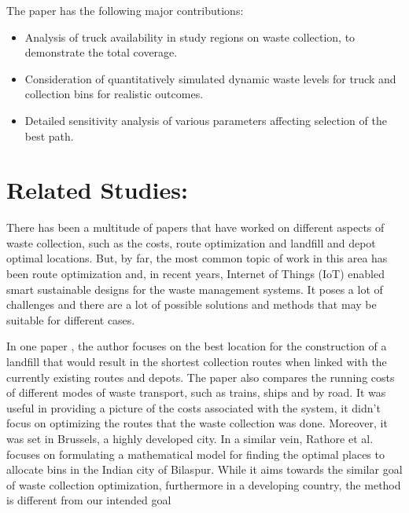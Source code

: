 \documentclass[12pt]{article}
\begin{document}
The paper has the following major contributions:
\begin{itemize}
\item Analysis of truck availability in study regions on waste collection, to demonstrate the total coverage.
\item Consideration of quantitatively simulated dynamic waste levels for truck and
collection bins for realistic outcomes.
\item Detailed sensitivity analysis of various parameters affecting selection of the best path.
\end{itemize}

\section{Related Studies:}

There has been a multitude of papers that have worked on different aspects of waste collection, such as the costs, route optimization and landfill and depot optimal locations. But, by far, the most common topic of work in this area has been route optimization and, in recent years, Internet of Things (IoT) enabled smart sustainable designs for the waste management systems. It poses a lot of challenges and there are a lot of possible solutions and methods that may be suitable for different cases. 

In one paper \cite{kulcar1996optimizing}, the author focuses on the best location for the construction of a landfill that would result in the shortest collection routes when linked with the currently existing routes and depots. The paper also compares the running costs of different modes of waste transport, such as trains, ships and by road. It was useful in providing a picture of the costs associated with the system, it didn't focus on optimizing the routes that the waste collection was done. Moreover, it was set in Brussels, a highly developed city. In a similar vein, Rathore et al. \cite{rathore2020location} focuses on formulating a mathematical model for finding the optimal places to allocate bins in the Indian city of Bilaspur. While it aims towards the similar goal of waste collection optimization, furthermore in a developing country, the method is different from our intended goal
\end{document}
